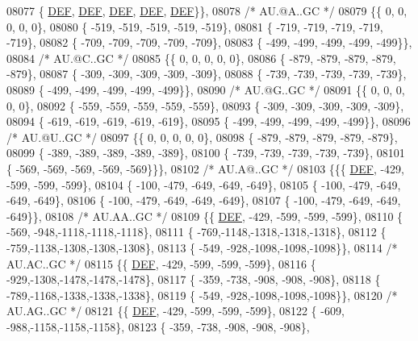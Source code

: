 \begin{DoxyCode}
08077 \{  \mbox{\hyperlink{1_88_84__epars_8h_a397419fc12b37ed479c8abb9d444d843}{DEF}},  \mbox{\hyperlink{1_88_84__epars_8h_a397419fc12b37ed479c8abb9d444d843}{DEF}},  \mbox{\hyperlink{1_88_84__epars_8h_a397419fc12b37ed479c8abb9d444d843}{DEF}},  \mbox{\hyperlink{1_88_84__epars_8h_a397419fc12b37ed479c8abb9d444d843}{DEF}},  \mbox{\hyperlink{1_88_84__epars_8h_a397419fc12b37ed479c8abb9d444d843}{DEF}}\}\},
08078 \textcolor{comment}{/* AU.@A..GC */}
08079 \{\{    0,    0,    0,    0,    0\},
08080 \{ -519, -519, -519, -519, -519\},
08081 \{ -719, -719, -719, -719, -719\},
08082 \{ -709, -709, -709, -709, -709\},
08083 \{ -499, -499, -499, -499, -499\}\},
08084 \textcolor{comment}{/* AU.@C..GC */}
08085 \{\{    0,    0,    0,    0,    0\},
08086 \{ -879, -879, -879, -879, -879\},
08087 \{ -309, -309, -309, -309, -309\},
08088 \{ -739, -739, -739, -739, -739\},
08089 \{ -499, -499, -499, -499, -499\}\},
08090 \textcolor{comment}{/* AU.@G..GC */}
08091 \{\{    0,    0,    0,    0,    0\},
08092 \{ -559, -559, -559, -559, -559\},
08093 \{ -309, -309, -309, -309, -309\},
08094 \{ -619, -619, -619, -619, -619\},
08095 \{ -499, -499, -499, -499, -499\}\},
08096 \textcolor{comment}{/* AU.@U..GC */}
08097 \{\{    0,    0,    0,    0,    0\},
08098 \{ -879, -879, -879, -879, -879\},
08099 \{ -389, -389, -389, -389, -389\},
08100 \{ -739, -739, -739, -739, -739\},
08101 \{ -569, -569, -569, -569, -569\}\}\},
08102 \textcolor{comment}{/* AU.A@..GC */}
08103 \{\{\{  \mbox{\hyperlink{1_88_84__epars_8h_a397419fc12b37ed479c8abb9d444d843}{DEF}}, -429, -599, -599, -599\},
08104 \{ -100, -479, -649, -649, -649\},
08105 \{ -100, -479, -649, -649, -649\},
08106 \{ -100, -479, -649, -649, -649\},
08107 \{ -100, -479, -649, -649, -649\}\},
08108 \textcolor{comment}{/* AU.AA..GC */}
08109 \{\{  \mbox{\hyperlink{1_88_84__epars_8h_a397419fc12b37ed479c8abb9d444d843}{DEF}}, -429, -599, -599, -599\},
08110 \{ -569, -948,-1118,-1118,-1118\},
08111 \{ -769,-1148,-1318,-1318,-1318\},
08112 \{ -759,-1138,-1308,-1308,-1308\},
08113 \{ -549, -928,-1098,-1098,-1098\}\},
08114 \textcolor{comment}{/* AU.AC..GC */}
08115 \{\{  \mbox{\hyperlink{1_88_84__epars_8h_a397419fc12b37ed479c8abb9d444d843}{DEF}}, -429, -599, -599, -599\},
08116 \{ -929,-1308,-1478,-1478,-1478\},
08117 \{ -359, -738, -908, -908, -908\},
08118 \{ -789,-1168,-1338,-1338,-1338\},
08119 \{ -549, -928,-1098,-1098,-1098\}\},
08120 \textcolor{comment}{/* AU.AG..GC */}
08121 \{\{  \mbox{\hyperlink{1_88_84__epars_8h_a397419fc12b37ed479c8abb9d444d843}{DEF}}, -429, -599, -599, -599\},
08122 \{ -609, -988,-1158,-1158,-1158\},
08123 \{ -359, -738, -908, -908, -908\},

\end{DoxyCode}
